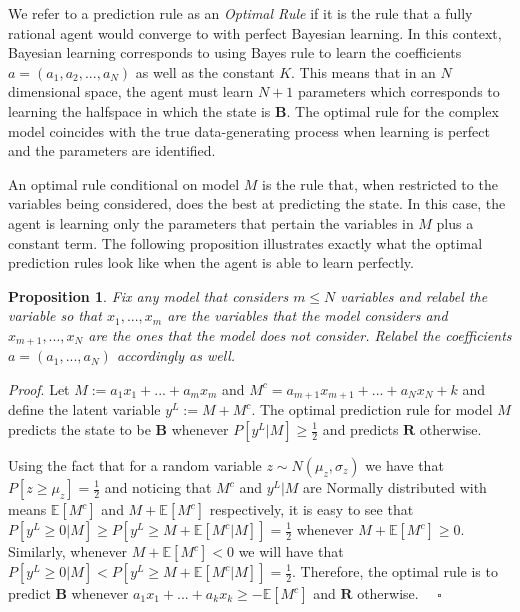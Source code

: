 \documentclass[
  12pt,
]{article}
\newtheorem{proposition}{Proposition} %
\begin{document}
We refer to a prediction rule as an \emph{Optimal Rule} if it is the
rule that a fully rational agent would converge to with perfect Bayesian
learning. In this context, Bayesian learning corresponds to using Bayes
rule to learn the coefficients \(a = (a_1, a_2, ..., a_N)\) as well as
the constant \(K\). This means that in an \(N\) dimensional space, the
agent must learn \(N+1\) parameters which corresponds to learning the
halfspace in which the state is \textbf{B}. The optimal rule for the
complex model coincides with the true data-generating process when
learning is perfect and the parameters are identified.

An optimal rule conditional on model \(M\) is the rule that, when
restricted to the variables being considered, does the best at
predicting the state. In this case, the agent is learning only the
parameters that pertain the variables in \(M\) plus a constant term. The
following proposition illustrates exactly what the optimal prediction
rules look like when the agent is able to learn perfectly.

\begin{proposition}
Fix any model that considers $m\leq N$ variables and relabel the variable so that $x_1, ..., x_m$ are the variables 
that the model considers and $x_{m+1}, ..., x_N$ are the ones that the model does not consider. Relabel the 
coefficients $a = (a_1, ..., a_N)$ accordingly as well. 
\end{proposition}

\emph{Proof}. Let \(M:=a_1x_1+...+a_mx_m\) and
\(M^c = a_{m+1}x_{m+1}+...+a_Nx_N+k\) and define the latent variable
\(y^L := M + M^c\). The optimal prediction rule for model \(M\) predicts
the state to be \(\textbf{B}\) whenever \(P[y^L|M]\geq \frac{1}{2}\) and
predicts \(\textbf{R}\) otherwise.

Using the fact that for a random variable \(z\sim N(\mu_z, \sigma_z)\)
we have that \(P[z\geq \mu_z]=\frac{1}{2}\) and noticing that \(M^c\)
and \(y^L|M\) are Normally distributed with means \(\mathbb{E}[M^c]\)
and \(M+\mathbb{E}[M^c]\) respectively, it is easy to see that
\(P[y^L\geq 0 | M] \geq P[y^L\geq M+\mathbb{E}[M^c | M]]=\frac{1}{2}\)
whenever \(M+\mathbb{E}[M^c]\geq 0\). Similarly, whenever
\(M+\mathbb{E}[M^c]< 0\) we will have that
\(P[y^L\geq 0 | M] < P[y^L\geq M+\mathbb{E}[M^c | M]]=\frac{1}{2}\).
Therefore, the optimal rule is to predict \(\mathbf{B}\) whenever
\(a_1x_1+...+a_kx_k\geq -\mathbb{E}[M^c]\) and \(\textbf{R}\) otherwise.
\(\quad \square\)

\hfill\break
\end{document}
